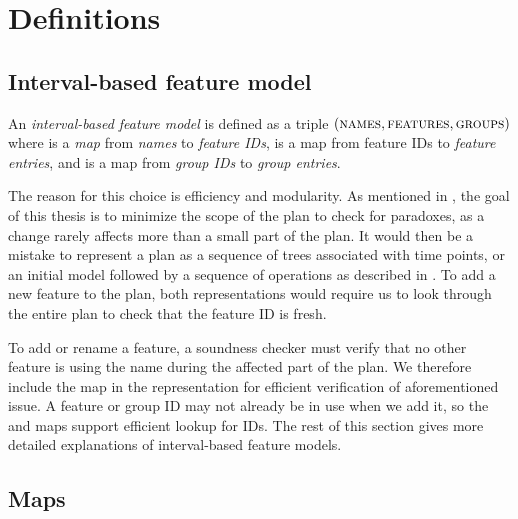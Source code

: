 \section{Definitions}

\subsection{Interval-based feature model}
\label{sub:interval-based-feature-model}

\begin{definition}
  An \emph{interval-based feature model} is defined as a triple $(\textsc{names}, \textsc{features}, \textsc{groups}{})$ where \names{} is a \emph{map} from \emph{names} to \emph{feature IDs}, \features{} is a map from feature IDs to \emph{feature entries}, and \groups{} is a map from \emph{group IDs} to \emph{group entries}. 
  \label{def:interval-based-feature-model}
\end{definition}

The reason for this choice is efficiency and modularity. As mentioned in , the goal of this thesis is to minimize the scope of the plan to check for paradoxes, as a change rarely affects more than a small part of the plan. It would then be a mistake to represent a plan as a sequence of trees associated with time points, or an initial model followed by a sequence of operations as described in  \parencite{art:consistency-preserving-evolution-planning}. To add a new feature to the plan, both representations would require us to look through the entire plan to check that the feature ID is fresh.

To add or rename a feature, a soundness checker must verify that no other feature is using the name during the affected part of the plan. We therefore include the \names{} map in the representation for efficient verification of aforementioned issue. A feature or group ID may not already be in use when we add it, so the \features{} and \groups{} maps support efficient lookup for IDs. The rest of this section gives more detailed explanations of interval-based feature models.

\subsection{Maps}
\label{sub:maps}

